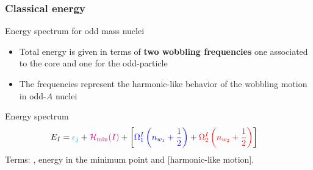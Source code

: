 \documentclass{beamer}
\begin{document}
\begin{frame}
  \frametitle{Classical energy}
\begin{block}{Energy spectrum for odd mass nuclei}
  \begin{itemize}
    \item Total energy is given in terms of \textbf{two wobbling frequencies} one associated to the {\color{red}core} and one for the {\color{blue}odd-particle}
    \item The frequencies represent the harmonic-like behavior of the wobbling motion in odd-$A$ nuclei
  \end{itemize}
\end{block}
  \begin{exampleblock}{Energy spectrum}
    \begin{align}
        E_I&={\color{cyan}\epsilon_{j}}+{\color{magenta}\mathcal{H}_\text{min}(I)}+\left[{\color{blue}\Omega_1^I\left(n_{w_1}+\frac{1}{2}\right)}+{\color{red}\Omega_2^I\left(n_{w_2}+\frac{1}{2}\right)}\right]
      \end{align} 
      Terms: {\color{cyan}{single particle energy}}, {\color{magenta}energy in the minimum point} and [harmonic-like motion].
    \end{exampleblock}
\end{frame}
\end{document}

